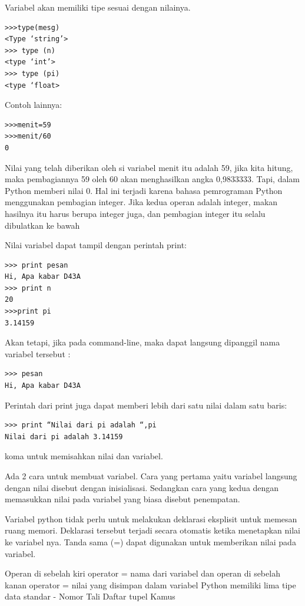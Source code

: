 Variabel akan memiliki tipe  sesuai dengan nilainya.
\begin{verbatim}
>>>type(mesg)
<Type ‘string’>
>>> type (n)
<type ‘int’>
>>> type (pi)
<type ‘float>
\end{verbatim}

Contoh lainnya:
\begin{verbatim}
>>>menit=59
>>>menit/60
0
\end{verbatim}
Nilai yang telah diberikan oleh si variabel menit itu adalah 59, jika kita hitung, maka pembagiannya 59 oleh 60 akan menghasilkan angka 0,9833333. Tapi, dalam Python memberi nilai 0. Hal ini terjadi karena bahasa pemrograman Python menggunakan pembagian integer. Jika kedua operan adalah integer, makan hasilnya itu harus berupa integer juga, dan pembagian integer itu selalu dibulatkan ke bawah

Nilai variabel dapat tampil dengan perintah print:
\begin{verbatim}
>>> print pesan
Hi, Apa kabar D43A
>>> print n
20
>>>print pi
3.14159
\end{verbatim}

Akan tetapi, jika pada command-line, maka dapat langsung dipanggil nama variabel tersebut :
\begin{verbatim}
>>> pesan
Hi, Apa kabar D43A
\end{verbatim}

Perintah dari print juga dapat memberi lebih dari satu nilai dalam satu baris:
\begin{verbatim}
>>> print “Nilai dari pi adalah “,pi
Nilai dari pi adalah 3.14159
\end{verbatim}

koma untuk memisahkan nilai dan variabel.\cite{utami2004logika}

Ada 2 cara untuk membuat variabel. Cara yang pertama yaitu variabel langsung dengan nilai disebut dengan inisialisasi. Sedangkan cara yang kedua dengan memasukkan nilai pada variabel yang biasa disebut penempatan.\cite{santoso2009bahasa}

Variabel python tidak perlu untuk melakukan deklarasi eksplisit untuk memesan ruang memori. Deklarasi tersebut terjadi secara otomatis ketika menetapkan nilai ke variabel nya.
Tanda sama (=) dapat digunakan untuk memberikan nilai pada variabel.

Operan di sebelah kiri operator =  nama dari variabel dan operan di sebelah kanan operator = nilai yang disimpan dalam variabel
Python memiliki lima tipe data standar -
Nomor
Tali
Daftar
tupel
Kamus

